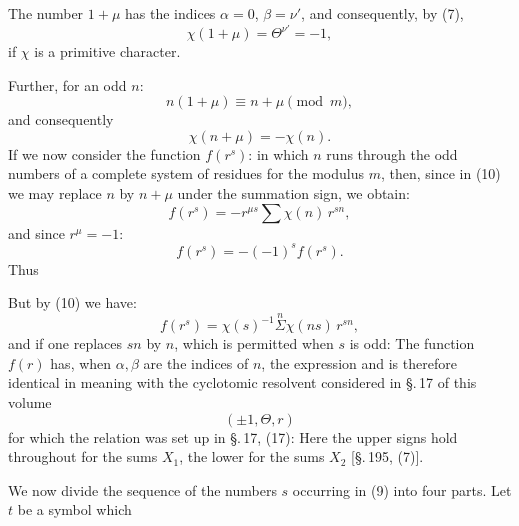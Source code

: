 
The number $1 + \mu$ has the indices $\alpha = 0$, $\beta = \nu'$, and
consequently, by (7),
\[
\chi(1+\mu) = \Theta^{\nu'} = -1,
\]
if $\chi$ is a primitive character.

Further, for an odd $n$:
\[
n(1+\mu) \equiv n + \mu \pmod{m},
\]
and consequently
\[
\chi(n+\mu) = -\chi(n).
\]
If we now consider the function $f(r^s)$:
in which $n$ runs through the odd numbers of a complete system of
residues for the modulus $m$, then, since in (10) we may replace $n$ by
$n+\mu$ under the summation sign, we obtain:
\[
f(r^s) = -r^{\mu s} \sum \chi(n)\, r^{sn},
\]
and since $r^\mu = -1$:
\[
f(r^s) = -(-1)^s f(r^s).
\]
Thus

But by (10) we have:
\[
f(r^s) = \chi(s)^{-1} \overset{n}{\Sigma} \chi(ns)\, r^{sn},
\]
and if one replaces $sn$ by $n$, which is permitted when $s$ is odd:
The function $f(r)$ has, when $\alpha, \beta$ are the indices of $n$,
the expression
and is therefore identical in meaning with the cyclotomic resolvent
considered in \S.\,17 of this volume
\[
(\pm 1, \Theta, r)
\]
for which the relation was set up in \S.\,17, (17):
Here the upper signs hold throughout for the sums $X_1$, the lower for
the sums $X_2$ [\S.\,195, (7)].

We now divide the sequence of the numbers $s$ occurring in (9) into
four parts. Let $t$ be a symbol which
